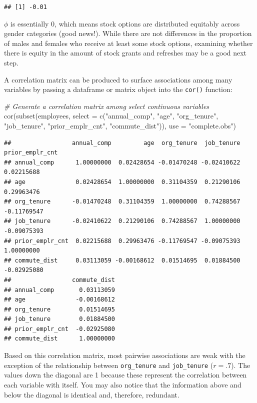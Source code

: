 \documentclass[
]{book}
\newenvironment{Shaded}{\begin{snugshade}}{\end{snugshade}}
\newcommand{\AttributeTok}[1]{\textcolor[rgb]{0.77,0.63,0.00}{#1}}
\newcommand{\CommentTok}[1]{\textcolor[rgb]{0.56,0.35,0.01}{\textit{#1}}}
\newcommand{\FunctionTok}[1]{\textcolor[rgb]{0.00,0.00,0.00}{#1}}
\newcommand{\NormalTok}[1]{#1}
\newcommand{\StringTok}[1]{\textcolor[rgb]{0.31,0.60,0.02}{#1}}
\begin{document}
\begin{verbatim}
## [1] -0.01
\end{verbatim}

\(\phi\) is essentially 0, which means stock options are distributed equitably across gender categories (good news!). While there are not differences in the proportion of males and females who receive at least some stock options, examining whether there is equity in the amount of stock grants and refreshes may be a good next step.

A correlation matrix can be produced to surface associations among many variables by passing a dataframe or matrix object into the \texttt{cor()} function:

\begin{Shaded}
\begin{Highlighting}[]
\CommentTok{\# Generate a correlation matrix among select continuous variables}
\FunctionTok{cor}\NormalTok{(}\FunctionTok{subset}\NormalTok{(employees, }\AttributeTok{select =} \FunctionTok{c}\NormalTok{(}\StringTok{"annual\_comp"}\NormalTok{, }\StringTok{"age"}\NormalTok{, }\StringTok{"org\_tenure"}\NormalTok{, }\StringTok{"job\_tenure"}\NormalTok{, }\StringTok{"prior\_emplr\_cnt"}\NormalTok{, }\StringTok{"commute\_dist"}\NormalTok{)), }\AttributeTok{use =} \StringTok{"complete.obs"}\NormalTok{)}
\end{Highlighting}
\end{Shaded}

\begin{verbatim}
##                 annual_comp         age  org_tenure  job_tenure prior_emplr_cnt
## annual_comp      1.00000000  0.02428654 -0.01470248 -0.02410622      0.02215688
## age              0.02428654  1.00000000  0.31104359  0.21290106      0.29963476
## org_tenure      -0.01470248  0.31104359  1.00000000  0.74288567     -0.11769547
## job_tenure      -0.02410622  0.21290106  0.74288567  1.00000000     -0.09075393
## prior_emplr_cnt  0.02215688  0.29963476 -0.11769547 -0.09075393      1.00000000
## commute_dist     0.03113059 -0.00168612  0.01514695  0.01884500     -0.02925080
##                 commute_dist
## annual_comp       0.03113059
## age              -0.00168612
## org_tenure        0.01514695
## job_tenure        0.01884500
## prior_emplr_cnt  -0.02925080
## commute_dist      1.00000000
\end{verbatim}

Based on this correlation matrix, most pairwise associations are weak with the exception of the relationship between \texttt{org\_tenure} and \texttt{job\_tenure} (\(r = .7\)). The values down the diagonal are 1 because these represent the correlation between each variable with itself. You may also notice that the information above and below the diagonal is identical and, therefore, redundant.
\end{document}
